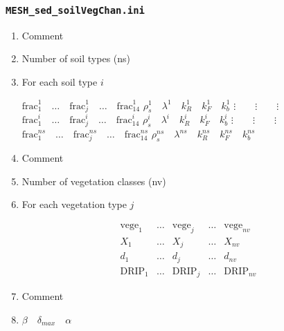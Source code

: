 \documentclass[12pt, letterpaper]{article}
\begin{document}


\subsubsection{\texttt{MESH\_sed\_soilVegChan.ini}}
{\tiny
\begin{enumerate}[label=Line \arabic*]\itemsep0em 
\item Comment
\item Number of soil types (ns)
\item For each soil type $i$
\parbox{\textwidth}{

$\text{frac}_1^1 \quad\hdots\quad \text{frac}_j^1 \quad\hdots\quad \text{frac}_{14}^1$ \newline
$\rho_s^1 \quad \lambda^1 \quad k_R^1 \quad k_F^1 \quad k_b^1$ \newline
$\vdots \quad\quad \vdots \quad\quad \vdots$ \newline
$\text{frac}_1^i \quad\hdots\quad \text{frac}_j^i \quad\hdots\quad \text{frac}_{14}^i$ \newline
$\rho_s^i \quad \lambda^i \quad k_R^i \quad k_F^i \quad k_b^i$ \newline
$\vdots \quad\quad \vdots \quad\quad \vdots$ \newline
$\text{frac}_1^{ns} \quad\hdots\quad \text{frac}_j^{ns} \quad\hdots\quad \text{frac}_{14}^{ns}$ \newline
$\rho_s^{ns} \quad \lambda^{ns} \quad k_R^{ns} \quad k_F^{ns} \quad k_b^{ns}$
}
\item Comment
\item Number of vegetation classes (nv)
\item For each vegetation type $j$
\parbox{\textwidth}{
\[
\begin{matrix} 
\text{vege}_1 & \hdots & \text{vege}_j & \hdots & \text{vege}_{nv} \\
X_1 & \hdots & X_j & \hdots & X_{nv} \\
d_1 & \hdots & d_j & \hdots & d_{nv} \\
\text{DRIP}_1 & \hdots & \text{DRIP}_j & \hdots & \text{DRIP}_{nv}
\end{matrix}
\]
}
\item Comment
\item $\beta \quad \delta_{max} \quad \alpha$
\end{enumerate}
}
\end{document}
